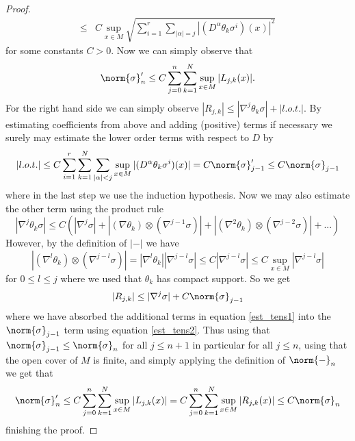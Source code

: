 \documentclass[12pt,a4paper]{article}
\theoremstyle{plain}
\theoremstyle{definition}
\newcommand{\nnorm}[2]{\norm{#1}_{#2}}
\newcommand{\tens}{\otimes}
\begin{document}
\begin{appendices}
\begin{proof}
\begin{align*}
    \leq &C\sup_{x\in M}\sqrt{\sum_{i=1}^r\sum_{|\alpha|=j}|(D^{\alpha}\theta_k\sigma^i)(x)|^2}
\end{align*}
for some constants $C>0$.
Now we can simply observe that
\begin{equation*}
    \nnorm{\sigma}{n}'\leq C \sum_{j=0}^n\sum_{k=1}^N \sup_{x\in M}|L_{j,k}(x)|.
\end{equation*}
For the right hand side we can simply observe $|R_{j,k}|\leq |\nabla^j\theta_k \sigma|+|l.o.t.|$. By estimating coefficients from above and adding (positive) terms if necessary we surely may estimate the lower order terms with respect to $D$ by
\begin{equation*}
    |l.o.t.|\leq C \sum_{i=1}^r\sum_{k=1}^N\sum_{|\alpha|<j}\sup_{x\in M}|(D^{\alpha}\theta_k\sigma^i)(x)|=C\nnorm{\sigma}{j-1}'\leq C\nnorm{\sigma}{j-1}
\end{equation*}
where in the last step we use the induction hypothesis. Now we may also estimate the other term using the product rule 
\begin{equation}
    \label{est_tens1}
    |\nabla^j\theta_k\sigma|\leq C( |\nabla^j \sigma| + |(\nabla \theta_k)\tens (\nabla^{j-1}\sigma)|+|(\nabla^2 \theta_k)\tens (\nabla^{j-2}\sigma)|+...)
\end{equation}
However, by the definition of $|-|$ we have
\begin{equation}
    \label{est_tens2}
    |(\nabla^l \theta_k)\tens (\nabla^{j-l}\sigma)|=|\nabla^l \theta_k||\nabla^{j-l}\sigma|\leq C|\nabla^{j-l}\sigma|\leq C\sup_{x\in M}|\nabla^{j-l}\sigma|
\end{equation}
for $0\leq l\leq j$ where we used that $\theta_k$ has compact support. So we get
\begin{equation*}
    |R_{j,k}|\leq |\nabla^j\sigma|+C\nnorm{\sigma}{j-1}
\end{equation*}
where we have absorbed the additional terms in equation \eqref{est_tens1} into the $\nnorm{\sigma}{j-1}$ term using equation \eqref{est_tens2}.
Thus using that $\nnorm{\sigma}{j-1}\leq \nnorm{\sigma}{n}$ for all $j\leq n+1$ in particular for all $j\leq n$, using that the open cover of $M$ is finite, and simply applying the definition of $\nnorm{-}{n}$ we get that 
\begin{equation*}
    \nnorm{\sigma}{n}'\leq C \sum_{j=0}^n\sum_{k=1}^N \sup_{x\in M}|L_{j,k}(x)|=C \sum_{j=0}^n\sum_{k=1}^N \sup_{x\in M}|R_{j,k}(x)|\leq C\nnorm{\sigma}{n}
\end{equation*}
finishing the proof. 
\end{proof}
\end{appendices}


\singlespacing\small


\end{document}
